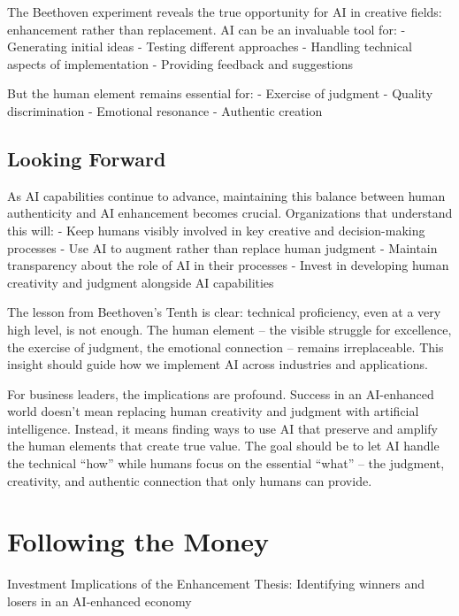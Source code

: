 \documentclass[
  Letterpaper,
]{scrbook}
\begin{document}
The Beethoven experiment reveals the true opportunity for AI in creative
fields: enhancement rather than replacement. AI can be an invaluable
tool for: - Generating initial ideas - Testing different approaches -
Handling technical aspects of implementation - Providing feedback and
suggestions

But the human element remains essential for: - Exercise of judgment -
Quality discrimination - Emotional resonance - Authentic creation

\section{Looking Forward}\label{looking-forward}

As AI capabilities continue to advance, maintaining this balance between
human authenticity and AI enhancement becomes crucial. Organizations
that understand this will: - Keep humans visibly involved in key
creative and decision-making processes - Use AI to augment rather than
replace human judgment - Maintain transparency about the role of AI in
their processes - Invest in developing human creativity and judgment
alongside AI capabilities

The lesson from Beethoven's Tenth is clear: technical proficiency, even
at a very high level, is not enough. The human element -- the visible
struggle for excellence, the exercise of judgment, the emotional
connection -- remains irreplaceable. This insight should guide how we
implement AI across industries and applications.

For business leaders, the implications are profound. Success in an
AI-enhanced world doesn't mean replacing human creativity and judgment
with artificial intelligence. Instead, it means finding ways to use AI
that preserve and amplify the human elements that create true value. The
goal should be to let AI handle the technical ``how'' while humans focus
on the essential ``what'' -- the judgment, creativity, and authentic
connection that only humans can provide.


\chapter{Following the Money}\label{following-the-money}

Investment Implications of the Enhancement Thesis: Identifying winners
and losers in an AI-enhanced economy

\hfill\break
\end{document}
